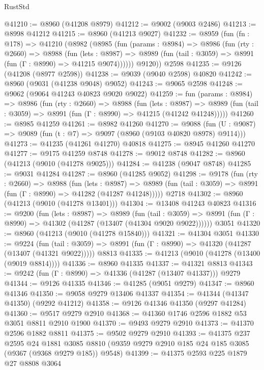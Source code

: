 \begin{lexlean}{RustStd}
\begin{coremodule}
@41210 := @8960 (@41208 @8979)
@41212 := @9002 (@9003 @2486)
@41213 := @8998 @41212
@41215 := @8960 (@41213 @9027)
@41232 := @8959
    (fun (fn : @178) =>
    @41210
      (@8982
        (@8985
          (fun (params : @8984) =>
          @8986
            (fun (rty : @2660) =>
            @8988
              (fun (lets : @8987) =>
              @8989 (fun (tail : @3059) => @8991 (fun (Γ : @8990) => @41215 @9074))))))
        @9120))
    @2598
@41235 := @9126 (@41208 (@8977 @2598))
@41238 := @9039 (@9040 @2598) @40820
@41242 := @8960 (@9031 (@41238 @9048) @9052)
@41243 := @9065 @2598
@41248 := @9062 (@9064 @41243 @40823 @9020 @9022)
@41259 := fun (params : @8984) =>
  @8986
    (fun (rty : @2660) =>
    @8988
      (fun (lets : @8987) =>
      @8989 (fun (tail : @3059) => @8991 (fun (Γ : @8990) => @41215 (@41242 @41248)))))
@41260 := @8985 @41259
@41261 := @8982 @41260
@41270 := @9088
    (fun (U : @9087) => @9089 (fun (t : @7) => @9097 (@8960 (@9103 @40820 @8978) @9114)))
@41273 := @41235 (@41261 @41270) @40818
@41275 := @8945 @41260 @41270
@41277 := @9175 @41259 @8748
@41278 := @9012 @8748
@41282 := @8960 (@41213 (@9010 (@41278 @9025)))
@41284 := @41238 (@9047 @8748)
@41285 := @9031 @41284
@41287 := @8960 (@41285 @9052)
@41298 := @9178
    (fun (rty : @2660) =>
    @8988
      (fun (lets : @8987) =>
      @8989 (fun (tail : @3059) => @8991 (fun (Γ : @8990) => @41282 (@41287 @41248)))))
    @2718
@41302 := @8960 (@41213 (@9010 (@41278 @13401)))
@41304 := @13408 @41243 @40823
@41316 := @9200
    (fun (lets : @8987) =>
    @8989
      (fun (tail : @3059) =>
      @8991 (fun (Γ : @8990) => @41302 (@41287 (@13407 (@41304 @9020 @9022))))))
    @3051
@41320 := @8960 (@41213 (@9010 (@41278 @15840)))
@41321 := @41304 @3051
@41330 := @9224
    (fun (tail : @3059) => @8991 (fun (Γ : @8990) => @41320 (@41287 (@13407 (@41321 @9022)))))
    @8813
@41335 := @41213 (@9010 (@41278 (@13400 (@9019 @8814))))
@41336 := @8960 @41335
@41337 := @41321 @8813
@41343 := @9242 (fun (Γ : @8990) => @41336 (@41287 (@13407 @41337))) @9279
@41344 := @9126 @41335
@41346 := @41285 (@9051 @9279)
@41347 := @8960 @41346
@41350 := @9058 @9279 @13406 @41337
@41354 := @41344 (@41347 @41350) (@9292 @41212)
@41358 := @9126 @41346 @41350 (@9297 @41284)
@41360 := @9517 @9279 @2910
@41368 := @41360 @1746 @2596 @1882 @53 @3051 @8811 @2910 @1900
@41370 := @9493 @9279 @2910
@41373 := @41370 @2596 @1882 @8811
@41375 := @9502 @9279 @2910
@41393 := @41375
    @237
    @2595
    @24
    @1881
    @3085
    @8810
    (@9359 @9279 @2910 @185 @24 @185 @3085 (@9367 (@9368 @9279 @185)) @9548)
@41399 := @41375 @2593 @225 @1879 @27 @8808 @3064

\end{coremodule}
\end{lexlean}
